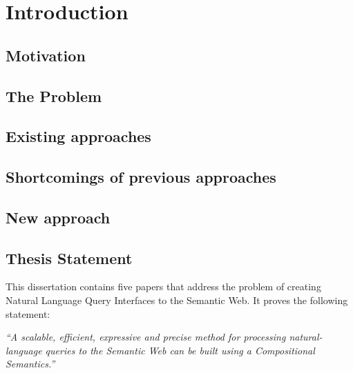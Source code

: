 \documentclass[../main.tex]{subfiles}
\begin{document}
\chapter{Introduction}
\begin{refsection}

\label{chapter:intro}


\section{Motivation}



\section {The Problem}




\section {Existing approaches}



\section {Shortcomings of previous approaches}


\section {New approach}


\section{Thesis Statement}

This dissertation contains five papers that address the problem of creating Natural Language Query Interfaces to the Semantic Web.  It proves the following statement:

\textit{``A scalable, efficient, expressive and precise method for processing natural-language queries to the Semantic Web can be built using a Compositional Semantics.''}


\end{refsection}
\end{document}
